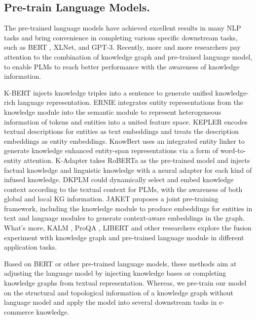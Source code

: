 \subsection{Pre-train Language Models.}
The pre-trained language models have achieved excellent results in many NLP tasks and bring convenience in completing various specific downstream tasks, such as BERT \cite{BERT}, XLNet\cite{XLNet-Yang-2019}, and GPT-3\cite{gpt3_brown2020language}. Recently, more and more researchers pay attention to the combination of knowledge graph and pre-trained language model, to enable PLMs to reach better performance with the awareness of knowledge information. 

K-BERT \cite{K_BERT-Liu-2019} injects knowledge triples into a sentence to generate unified knowledge-rich language representation. 
ERNIE \cite{ERNIE-Zhang-2019} integrates entity representations from the knowledge module into the semantic module to represent heterogeneous information of tokens and entities into a united feature space. 
KEPLER \cite{KEPLER-Wang-2019} encodes textual descriptions for entities as text embeddings and treats the description embeddings as entity embeddings.
KnowBert \cite{KnowBert-Peters-2019} uses an integrated entity linker to generate knowledge enhanced entity-span representations via a form of word-to-entity attention.
K-Adapter \cite{wang2020K_Adapter} takes RoBERTa as the pre-trained model and injects factual knowledge and linguistic knowledge with a neural adapter for each kind of infused knowledge. 
DKPLM \cite{su2020DKPLM} could dynamically select and embed knowledge context according to the textual context for PLMs, with the awareness of both global and local KG information.
JAKET \cite{yu2020JAKET} proposes a joint pre-training framework, including the knowledge module to produce embeddings for entities in text and language modules to generate context-aware embeddings in the graph. What's more, KALM \cite{rosset2020KALM}, ProQA \cite{xiong2020progressively}, LIBERT\cite{lauscher2019informing} and other researchers explore the fusion experiment with knowledge graph and pre-trained language module in different application tasks.

Based on BERT or other pre-trained language models, these methods aim at adjusting the language model by injecting knowledge bases or completing knowledge graphs from textual representation. Whereas, we pre-train our model on the structural and topological information of a knowledge graph without language model and apply the model into several downstream tasks in e-commerce knowledge.

